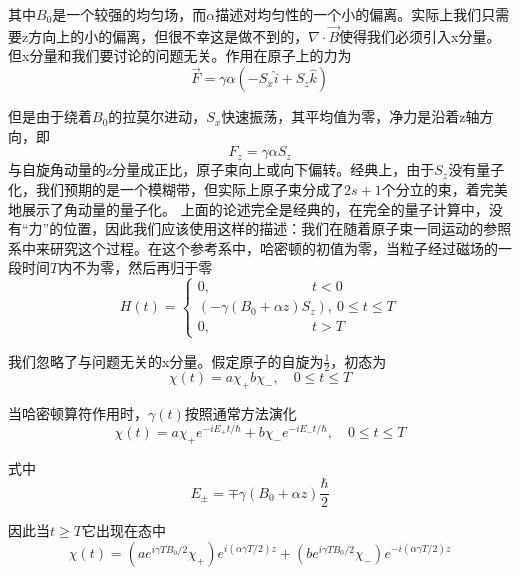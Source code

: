 \documentclass[UTF8]{ctexart}
\begin{document}
\noindent 其中$B_0$是一个较强的均匀场，而$\alpha$描述对均匀性的一个小的偏离。实际上我们只需要z方向上的小的偏离，但很不幸这是做不到的，$\nabla \cdot \vec{B}$使得我们必须引入x分量。但x分量和我们要讨论的问题无关。作用在原子上的力为
\begin{equation}
    \vec{F} = \gamma \alpha (-S_x \hat{i} + S_z \hat{k})
\end{equation}

    但是由于绕着$B_0$的拉莫尔进动，$S_x$快速振荡，其平均值为零，净力是沿着z轴方向，即
    \begin{equation}
        F_z = \gamma \alpha S_z
    \end{equation}
\noindent 与自旋角动量的z分量成正比，原子束向上或向下偏转。经典上，由于$S_z$没有量子化，我们预期的是一个模糊带，但实际上原子束分成了$2s+1$个分立的束，着完美地展示了角动量的量子化。
    上面的论述完全是经典的，在完全的量子计算中，没有“力”的位置，因此我们应该使用这样的描述：我们在随着原子束一同运动的参照系中来研究这个过程。在这个参考系中，哈密顿的初值为零，当粒子经过磁场的一段时间$T$内不为零，然后再归于零
    \begin{equation}
        H(t) = \left\{ \begin{array}{l}
            {0, \qquad \qquad \qquad \quad \ t<0} \\
            {(-\gamma(B_0 + \alpha z)S_z),\ 0\le t \le T}\\
            {0,\qquad \qquad \qquad \quad \  t>T}
        \end{array}\right.
    \end{equation}

\noindent 我们忽略了与问题无关的x分量。假定原子的自旋为$\frac{1}{2}$，初态为
\begin{equation}
    \chi(t) = a \chi_+ b \chi_-, \quad 0 \le t \le T
\end{equation}

\noindent 当哈密顿算符作用时，$\gamma(t)$按照通常方法演化
\begin{equation}
    \chi(t) = a \chi_+ e^{-i E_+ t / \hbar} + b \chi_- e^{-i E_- t / \hbar},\quad 0 \le t \le T
\end{equation}

\noindent 式中
\begin{equation}
    E_{\pm} = \mp \gamma (B_0+\alpha z) \frac{\hbar}{2}
\end{equation}

\noindent 因此当$t \ge T$它出现在态中
\begin{equation}
    \chi(t) = \left(ae^{i\gamma T B_0/2} \chi_+\right)e^{i(\alpha \gamma T/2)z} + \left(be^{i\gamma T B_0/2} \chi_-\right)e^{-i(\alpha \gamma T/2)z}
\end{equation}
\end{document}

